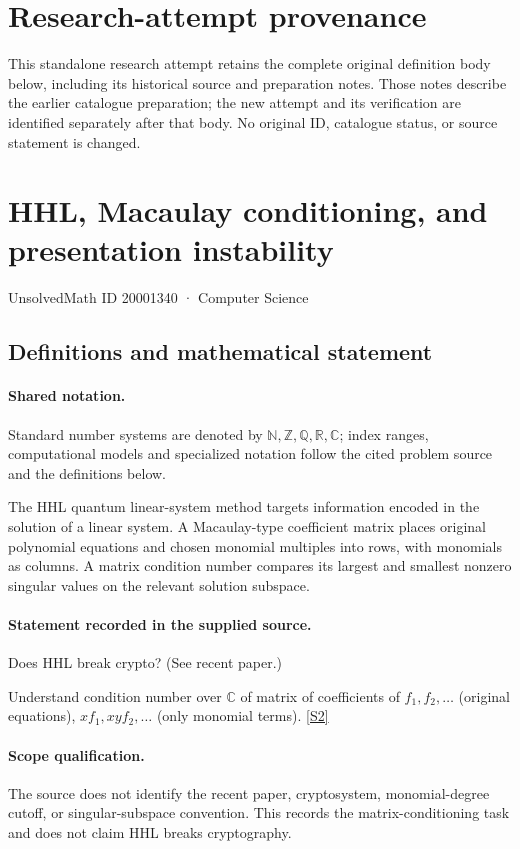 \documentclass[11pt]{article}
\begin{document}
\section*{Research-attempt provenance}
This standalone research attempt retains the complete original definition body below,
including its historical source and preparation notes. Those notes describe the
earlier catalogue preparation; the new attempt and its verification are identified
separately after that body. No original ID, catalogue status, or source statement is changed.

\section{HHL, Macaulay conditioning, and presentation instability}\label{20001340}
{\small UnsolvedMath ID 20001340 · Computer Science}
\subsection{Definitions and mathematical statement}

\paragraph{Shared notation.}Standard number systems are denoted by $\mathbb N,\mathbb Z,\mathbb Q,\mathbb R,\mathbb C$; index ranges, computational models and specialized notation follow the cited problem source and the definitions below.


The HHL quantum linear-system method targets information encoded in the solution of a linear system. A Macaulay-type coefficient matrix places original polynomial equations and chosen monomial multiples into rows, with monomials as columns. A matrix condition number compares its largest and smallest nonzero singular values on the relevant solution subspace.
\paragraph{Statement recorded in the supplied source.}
Does HHL break crypto? (See recent paper.)

Understand condition number over $\mathbb C$ of matrix of coefficients of $f_1, f_2, \dots$ (original equations), $xf_1, xyf_2, \dots$ (only monomial terms). \href{http://aimpl.org/quantumalg/6/}{[S2]}
\paragraph{Scope qualification.}
The source does not identify the recent paper, cryptosystem, monomial-degree cutoff, or singular-subspace convention. This records the matrix-conditioning task and does not claim HHL breaks cryptography.
\end{document}

